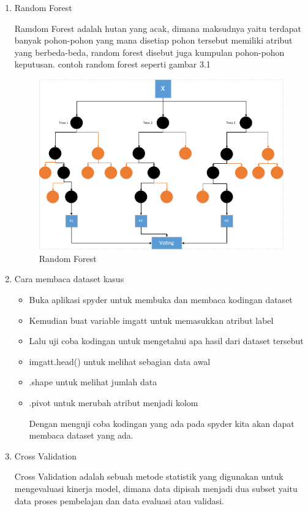 \begin{enumerate}
\item Random Forest
\par
Ramdom Forest adalah hutan yang acak, dimana maksudnya yaitu terdapat banyak pohon-pohon yang mana disetiap pohon tersebut memiliki atribut yang berbeda-beda, random forest disebut juga kumpulan pohon-pohon keputusan. contoh random forest seperti gambar 3.1
\begin{figure}[ht]
\centering
\includegraphics[scale=0.6]{figures/RF/1_1.png}
\caption{Random Forest}
\end{figure}
\item Cara membaca dataset kasus
\begin{itemize}
\item Buka aplikasi spyder untuk membuka dan membaca kodingan dataset
\item Kemudian buat  variable imgatt untuk memasukkan atribut label
\item Lalu uji coba kodingan untuk mengetahui apa hasil dari dataset tersebut
\item imgatt.head() untuk melihat sebagian data awal
\item .shape untuk melihat jumlah data
\item .pivot untuk merubah atribut menjadi kolom
\par
Dengan menguji coba kodingan yang ada pada spyder kita akan dapat membaca dataset yang ada.
\end{itemize}
\item Cross Validation
\par 
Cross Validation adalah sebuah metode statistik yang digunakan untuk mengevaluasi kinerja model, dimana data dipisah menjadi dua subset yaitu data proses pembelajan dan data evaluasi atau validasi.

\end{enumerate}
